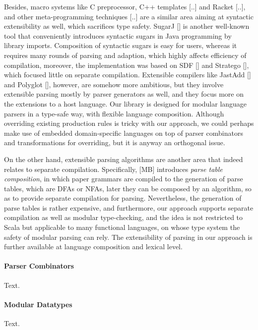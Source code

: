 Besides, macro systems like C preprocessor, C++ templates [..] and Racket [..], and other meta-programming techniques [..] are a similar area aiming at syntactic extensibility as well, which sacrifices type safety. SugarJ [] is another well-known tool that conveniently introduces syntactic sugars in Java programming by library imports. Composition of syntactic sugars is easy for users, whereas it requires many rounds of parsing and adaption, which highly affects efficiency of compilation, moreover, the implementation was based on SDF [] and Stratego [], which focused little on separate compilation. Extensible compilers like JastAdd [] and Polyglot [], however, are somehow more ambitious, but they involve extensible parsing mostly by parser generators as well, and they focus more on the extensions to a host language. Our library is designed for modular language parsers in a type-safe way, with flexible language composition. Although overriding existing production rules is tricky with our approach, we could perhaps make use of embedded domain-specific languages on top of parser combinators and transformations for overriding, but it is anyway an orthogonal issue.      

On the other hand, extensible parsing algorithms are another area that indeed relates to separate compilation. Specifically, [MB] introduces \textit{parse table composition}, in which paper grammars are compiled to the generation of parse tables, which are DFAs or NFAs, later they can be composed by an algorithm, so as to provide separate compilation for parsing. Nevertheless, the generation of parse tables is rather expensive, and furthermore, our approach supports separate compilation as well as modular type-checking, and the idea is not restricted to Scala but applicable to many functional languages, on whose type system the safety of modular parsing can rely. The extensibility of parsing in our approach is further available at language composition and lexical level.

\paragraph*{Parser Combinators} Text.

\paragraph*{Modular Datatypes} Text.
